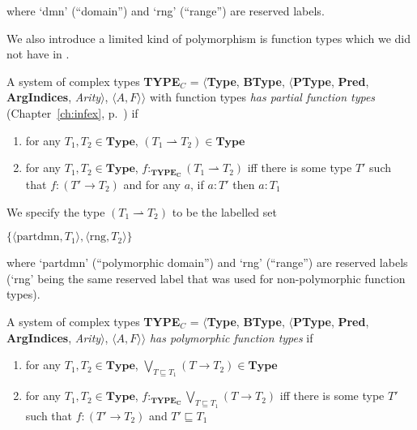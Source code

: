 where `dmn' (``domain'') and `rng' (``range'') are reserved labels.

We also introduce a limited kind of polymorphism is function types
which we did not have in \cite{Cooper2012}.

A system of complex types {\bf TYPE$_C$} = $\langle${\bf Type}, {\bf BType},
$\langle$\textbf{PType}, {\bf Pred}, \textbf{ArgIndices}, {\it
  Arity\/}$\rangle$, $\langle A,F\rangle$$\rangle$ with function types
\textit{has
  partial function types} (Chapter~\ref{ch:infex},
p.~\pageref{ex:partialfuntypes}) if
\begin{enumerate} 
 
\item for any $T_1,T_2 \in \textbf{Type}$,
  $(T_1\rightharpoonup T_2) \in \textbf{Type}$ 
 
\item for any $T_1,T_2 \in \textbf{Type}$,
  $f:_{\mathbf{TYPE_C}}(T_1\rightharpoonup T_2)$ iff there is some type $T'$ such that
  $f:(T'\rightarrow T_2)$ and for any $a$, if $a:T'$ then $a:T_1$
   
 
\end{enumerate}

We
specify the type $(T_1\rightharpoonup T_2)$   to be the labelled set

$\{\langle\mathrm{partdmn},T_1\rangle,\langle\mathrm{rng},T_2\rangle\}$

where `partdmn' (``polymorphic domain'') and `rng' (``range'') are
reserved labels (`rng' being the same reserved label that was used for
non-polymorphic function types).




A system of complex types {\bf TYPE$_C$} = $\langle${\bf Type}, {\bf BType},
$\langle$\textbf{PType}, {\bf Pred}, \textbf{ArgIndices}, {\it
  Arity\/}$\rangle$, $\langle A,F\rangle$$\rangle$ \textit{has
  polymorphic function types} if
\begin{enumerate} 
 
\item for any $T_1,T_2 \in \textbf{Type}$,
  $\displaystyle{\bigvee_{T\sqsubseteq T_1}}(T\rightarrow T_2) \in \textbf{Type}$ 
 
\item for any $T_1,T_2 \in \textbf{Type}$,
  $f:_{\mathbf{TYPE_C}}\displaystyle{\bigvee_{T\sqsubseteq
      T_1}}(T\rightarrow T_2)$ iff there is some type $T'$ such that
  $f:(T'\rightarrow T_2)$ and $T'\sqsubseteq T_1$
   
 
\end{enumerate}


